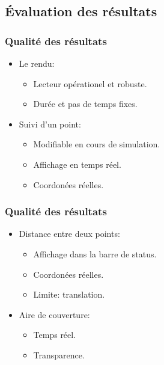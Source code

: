 \documentclass{beamer}
\begin{document}
\subsection{Évaluation des résultats}
\begin{frame}
    \frametitle{Qualité des résultats}
    \begin{itemize}
        \item Le rendu:
            \begin{itemize}
                \item Lecteur opérationel et robuste.
                \item Durée et pas de temps fixes.
            \end{itemize}
        \item Suivi d'un point:
            \begin{itemize}
                \item Modifiable en cours de simulation.
                \item Affichage en temps réel.
                \item Coordonées réelles.
            \end{itemize}
    \end{itemize}
\end{frame}
\begin{frame}
    \frametitle{Qualité des résultats}
    \begin{itemize}
        \item Distance entre deux points:
            \begin{itemize}
                \item Affichage dans la barre de status.
                \item Coordonées réelles.
                \item Limite: translation.
            \end{itemize}
        \item Aire de couverture:
            \begin{itemize}
                \item Temps réel.
                \item Transparence.
            \end{itemize}
    \end{itemize}
\end{frame}
\end{document}

